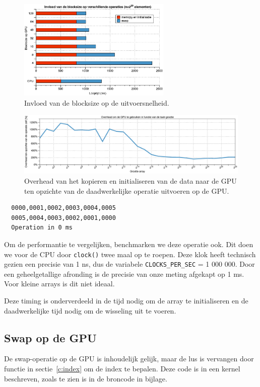 \documentclass[twocolumn, a4paper]{article}
\begin{document}
\begin{figure}
  \centering
  \includegraphics[width=0.65\textwidth]{blocksize.eps}
  \caption{Invloed van de blocksize op de uitvoersnelheid.}
  \label{blocksize}
\end{figure}
  
\begin{figure}
    \centering
    \includegraphics[width=1.03\textwidth]{overhead.eps}
    \caption{Overhead van het kopieren en initialiseren van de data naar de GPU ten opzichte van de daadwerkelijke operatie uitvoeren op de GPU.}
    \label{fig:overhead}
\end{figure}

\begin{verbatim}
  0000,0001,0002,0003,0004,0005
  0005,0004,0003,0002,0001,0000 
  Operation in 0 ms
\end{verbatim}

Om de performantie te vergelijken, benchmarken we deze operatie ook. Dit doen we voor de CPU door \texttt{clock()} twee maal op te roepen. Deze klok heeft technisch gezien een precisie van 1 ns, dus de variabele \texttt{CLOCKS_PER_SEC} = 1 000 000. Door een geheelgetallige afronding is de precisie van onze meting afgekapt op 1 ms. Voor kleine arrays is dit niet ideaal.

Deze timing is onderverdeeld in de tijd nodig om de array te initialiseren en de daadwerkelijke tijd nodig om de wisseling uit te voeren.

\subsection{Swap op de GPU}
De swap-operatie op de GPU is inhoudelijk gelijk, maar de lus is vervangen door functie in sectie~\ref{c:index} om de index te bepalen. Deze code is in een kernel beschreven, zoals te zien is in de broncode in bijlage.
\end{document}
